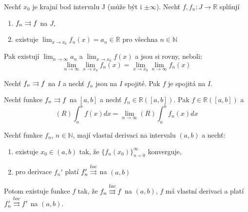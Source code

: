 \begin{vetat}
Nechť $x_0$ je krajní bod intervalu J (může být i $\pm \infty$). Nechť $f, f_n : J \rightarrow \mathbb{R}$ splňují
\begin{enumerate}
\item $f_n \rightrightarrows f$ na $J$,
\item existuje $\lim_{x \rightarrow x_0} f_n(x) = a_n \in \mathbb{R}$ pro všechna $n \in \mathbb{N}$
\end{enumerate}
Pak existují $\lim_{n \rightarrow \infty} a_n$ a $\lim_{x \rightarrow x_0} f(x)$ a jsou si rovny, neboli:
$$\lim_{n \rightarrow \infty} \lim_{x \rightarrow x_0} f_n(x) = \lim_{x \rightarrow x_0} \lim_{n \rightarrow \infty} f_n(x)$$
\end{vetat}

\begin{dusledek}
Nechť $f_n \rightrightarrows f$ na $I$ a nechť $f_n$ jsou na $I$ spojité. Pak $f$ je spojitá na $I$.
\end{dusledek}

\begin{vetal}
Nechť funkce $f_n \rightrightarrows f$ na $[a,b]$ a nechť $f_n \in \mathbb{R} ([a,b])$. Pak $f \in \mathbb{R}([a,b])$ a 
$$(R) \int_a^b f(x) dx = \lim_{n \rightarrow \infty} (R) \int_a^b f_n(x) dx$$
\end{vetal}

\begin{vetat}
Nechť funkce $f_n$, $n \in \mathbb{N}$, mají vlastní derivaci na intervalu $(a,b)$ a nechť:
\begin{enumerate}
\item existuje $x_0 \in (a,b)$ tak, že $\{f_n(x_0)\}_{n=0}^{\infty}$ konverguje,
\item pro derivace $f_n'$ platí $f_n' \overset{loc}{\rightrightarrows}$ na $(a,b)$
\end{enumerate}
Potom existuje funkce $f$ tak, že $f_n \overset{loc}{\rightrightarrows} f$ na $(a,b)$, $f$ má vlastní derivaci a platí $f_n' \overset{loc}{\rightrightarrows} f'$ na $(a,b)$.
\end{vetat}
